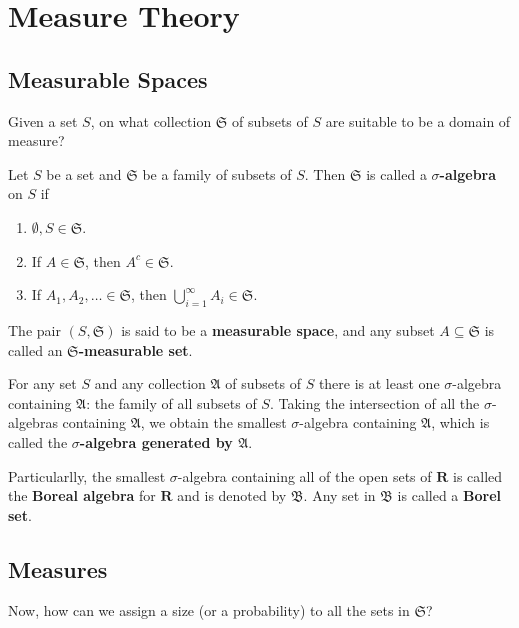\chapter{Measure Theory}

\section{Measurable Spaces}

Given a set $S$, on what collection $\mathfrak{S}$ of subsets of $S$ are suitable to be a domain of measure?

\begin{definition}
	Let $S$ be a set and $\mathfrak{S}$ be a family of subsets of $S$. Then $\mathfrak{S}$ is called a \textbf{$\sigma$-algebra} on $S$ if
	\begin{enumerate}
		\item $\emptyset, S \in \mathfrak{S}$.
		\item If $A \in \mathfrak{S}$, then $A^c \in \mathfrak{S}$.
		\item If $A_1, A_2, \ldots \in \mathfrak{S}$, then $\bigcup_{i=1}^\infty A_i \in \mathfrak{S}$.
	\end{enumerate}

	The pair $(S, \mathfrak{S})$ is said to be a \textbf{measurable space}, and any subset $A \subseteq \mathfrak{S}$ is called an \textbf{$\mathfrak{S}$-measurable set}.
\end{definition}

For any set $S$ and any collection $\mathfrak{A}$ of subsets of $S$ there is at least one $\sigma$-algebra containing $\mathfrak{A}$: the family of all subsets of $S$. Taking the intersection of all the $\sigma$-algebras containing $\mathfrak{A}$, we obtain the smallest $\sigma$-algebra containing $\mathfrak{A}$, which is called the \textbf{$\sigma$-algebra generated by $\mathfrak{A}$}.

Particularlly, the smallest $\sigma$-algebra containing all of the open sets of $\textbf{R}$ is called the \textbf{Boreal algebra} for $\textbf{R}$ and is denoted by $\mathfrak{B}$. Any set in $\mathfrak{B}$ is called a \textbf{Borel set}.

\section{Measures}

Now, how can we assign a size (or a probability) to all the sets in $\mathfrak{S}$?


